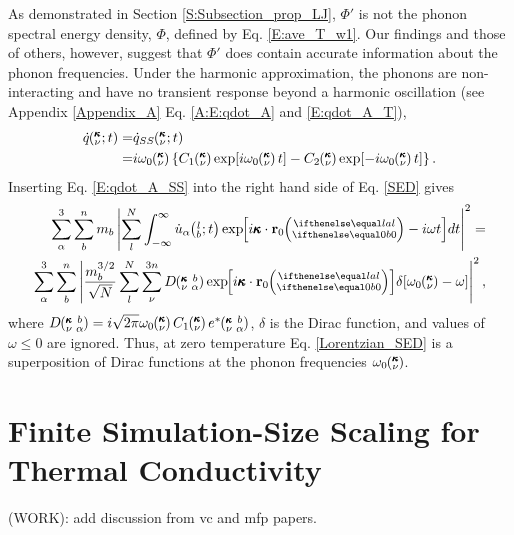 As demonstrated in Section \ref{S:Subsection_prop_LJ}, $\Phi'$ is not 
the phonon spectral energy density, $\Phi$, defined by Eq$.$ 
\eqref{E:ave_T_w1}. Our findings and those of others,
\cite{maruyama_molecular_2003,dekoker_thermal_2009,
thomas_predicting_2010,qiu_molecular_2011,shiomi_thermal_2011} 
however, suggest that $\Phi'$ does contain accurate information about 
the phonon frequencies.  Under the harmonic approximation, the phonons 
are non-interacting and have no transient response beyond a harmonic 
oscillation (see Appendix \ref{Appendix_A} Eq$.$ \eqref{A:E:qdot_A} 
and \eqref{E:qdot_A_T}),
\begin{equation}\label{E:qdot_A_SS}
\begin{split}
\dot{q}\kvt =& \dot{q}_{SS}\kvt  \\
=& i\omega_0\kv\left\{C_1\kv\exp[i\omega_0\kv t]-C_2\kv
\exp[-i\omega_0\kv t]\right\}.
 \end{split}
\end{equation}
Inserting Eq$.$ \eqref{E:qdot_A_SS} into the right hand side of Eq$.$ 
\eqref{SED} gives
\begin{equation}\label{Delta_SED}
\begin{split}
\sum_\alpha^3 \sum_b^n m_b \left| \sum_l^N  \int_{-\infty}^{\infty} 
\dot{u}_{\alpha}\lbt \EXP{i\pmb{\kappa}\cdot
\mathbf{r}_0\ab{l}{0}-i\omega t} 
dt \right|^2 =& \\
\sum_\alpha^3 \sum_b^n\left| \frac{m_b^{3/2}}{\sqrt{N}} \sum_l^N 
\sum_{\nu}^{3n}  D\kvba \EXP{i\pmb{\kappa}\cdot\mathbf{r}_0\ab{l}{0}} 
\delta[ \omega_0\kv - \omega] \right|^2 ,
 \end{split}
\end{equation}
where $D\kvba = i\sqrt{2\pi} \omega_0\kv C_1\kv e^*\kvba$, $\delta$ is 
the Dirac function, and values of $\omega \le 0$ are ignored. Thus, at 
zero temperature Eq$.$ \eqref{Lorentzian_SED} is a superposition of Dirac 
functions at the phonon frequencies $\omega_0\mspace{-4.0mu}\left(\mspace{-8.0mu} \begin{smallmatrix}&\pmb{\kappa} \\&\nu \end{smallmatrix}\mspace{-3.0mu}\right)$.
\section{\label{Appendix_C}Finite Simulation-Size Scaling for Thermal 
Conductivity}
(WORK): add discussion from vc and mfp papers. 

